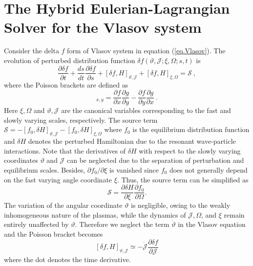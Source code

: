 \section{The Hybrid Eulerian-Lagrangian Solver for the Vlasov system}
\label{sec:vlasov}
Consider the  delta $f$ form of Vlasov system in equation (\ref{eq.Vlasov}). The evolution of  perturbed distribution function $\delta f(\vartheta,\mathcal{J};\xi,\Omega;s,t)$ is
\begin{equation}\label{eq.deltaf}
    \frac{\partial \delta f}{\partial t}+ \frac{d s_{}}{d t} \frac{\partial \delta f}{\partial s} + \left[\delta f, H\right]_{\vartheta,\mathcal{J}} +  \left[\delta f, H\right]_{\xi,\Omega} = \mathcal{S}~,
\end{equation}
where the   Poisson brackets are defined as
\begin{equation}
    [f,~g]_{x,y} = \frac{\partial f}{\partial x}\frac{\partial g}{\partial y}-\frac{\partial f}{\partial y}\frac{\partial g}{\partial x}~.
\end{equation}
Here $\xi,\Omega$ and $\vartheta,\mathcal{J}$ are the canonical variables corresponding to the fast  and slowly varying scales, respectively.
The source term $\mathcal{S}= -\left[f_0, \delta H\right]_{\vartheta, \mathcal{J}} - \left[f_0, \delta H\right]_{\xi, \Omega}$ 
where $f_0$ is the equilibrium distribution function and $\delta H$ denotes the perturbed Hamiltonian due to the resonant wave-particle interactions.
Note that the derivatives of $\delta H$ with respect to the slowly varying coordinates $\vartheta$ and $\mathcal{J}$ can be neglected due to the separation of perturbation and equilibrium scales. Besides, $\partial f_0/\partial \xi$ is vanished since $f_0$ does not generally depend on the fast varying angle coordinate $\xi$.
Thus, the source term can be simplified as 
\begin{equation}
     \mathcal{S} = \frac{\partial \delta H}{\partial \xi}\frac{\partial f_0}{\partial \Omega}.
\end{equation}
The variation of the angular coordinate $\vartheta$ is negligible, owing to the weakly inhomogeneous nature of the plasmas, while the dynamics of $\mathcal{J}, \Omega$, and $\xi$ remain entirely unaffected by $\vartheta$.
Therefore we neglect the term $ \dot{\vartheta} $ in the Vlasov equation and the  Poisson bracket becomes
\begin{equation}
\left[\delta f, H\right]_{\vartheta,\mathcal{J}}\simeq 
 -\dot{\mathcal{J}} \frac{\partial \delta f}{\partial \mathcal{J}}      
\end{equation}
where the dot denotes the time derivative.

